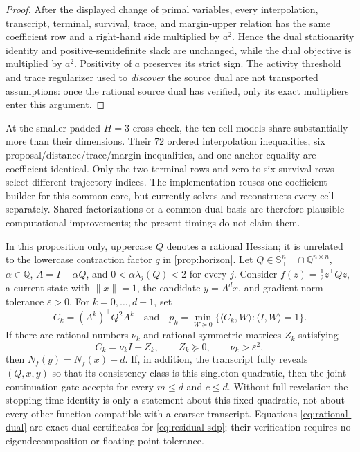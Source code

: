 \documentclass[smallextended]{svjour3}
\newcommand{\ip}[2]{\langle #1,#2\rangle}
\newcommand{\norm}[1]{\lVert #1\rVert}
\newcommand{\eps}{\varepsilon}
\begin{document}
\begin{proof}
After the displayed change of primal variables, every interpolation,
transcript, terminal, survival, trace, and margin-upper relation has the same
coefficient row and a right-hand side multiplied by $a^2$.  Hence the dual
stationarity identity and positive-semidefinite slack are unchanged, while the
dual objective is multiplied by $a^2$.  Positivity of $a$ preserves its strict
sign.  The activity threshold and trace regularizer used to \emph{discover} the
source dual are not transported assumptions: once the rational source dual has
verified, only its exact multipliers enter this argument.
\end{proof}

At the smaller padded $H=3$ cross-check, the ten cell models share
substantially more than their dimensions.  Their 72
ordered interpolation inequalities, six proposal/distance/trace/margin
inequalities, and one anchor equality are coefficient-identical.  Only the two
terminal rows and zero to six survival rows select different trajectory
indices.  The implementation reuses one coefficient builder for this common
core, but currently solves and reconstructs every cell separately.  Shared
factorizations or a common dual basis are therefore plausible computational
improvements; the present timings do not claim them.

\begin{proposition}
\label{prop:rational-residual}
In this proposition only, uppercase $Q$ denotes a rational Hessian; it is
unrelated to the lowercase contraction factor $q$ in \cref{prop:horizon}.
Let $Q\in\mathbb S_{++}^n\cap\mathbb Q^{n\times n}$,
$\alpha\in\mathbb Q$, $A=I-\alpha Q$, and
$0<\alpha\lambda_j(Q)<2$ for every $j$.  Consider
$f(z)=\tfrac12 z^\top Qz$, a current state with $\norm{x}=1$, the candidate
$y=A^d x$, and gradient-norm tolerance $\eps>0$.  For $k=0,\ldots,d-1$, set
\begin{equation}
 C_k=(A^k)^\top Q^2A^k
 \quad\text{and}\quad
 p_k=\min_{W\succeq0}\{\ip{C_k}{W}:\ip{I}{W}=1\}.       \label{eq:residual-sdp}
\end{equation}
If there are rational numbers $\nu_k$ and rational symmetric matrices
$Z_k$ satisfying
\begin{equation}
 C_k=\nu_k I+Z_k,\qquad Z_k\succeq0,\qquad
 \nu_k>\eps^2,                                      \label{eq:rational-dual}
\end{equation}
then $N_f(y)=N_f(x)-d$.  If, in addition, the transcript fully reveals
$(Q,x,y)$ so that its
consistency class is this singleton quadratic, then the joint continuation
gate accepts for every $m\leq d$ and $c\leq d$.  Without full revelation the
stopping-time identity is only a statement about this fixed quadratic, not
about every other function compatible with a coarser transcript.  Equations
\eqref{eq:rational-dual} are exact dual
certificates for \eqref{eq:residual-sdp}; their verification requires no
eigendecomposition or floating-point tolerance.
\end{proposition}
\end{document}
